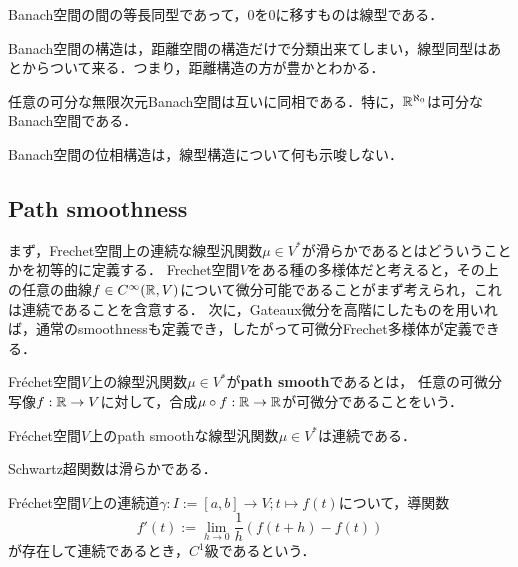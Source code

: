 \documentclass[uplatex,dvipdfmx]{jsreport}
\begin{document}
\begin{theorem}
    Banach空間の間の等長同型であって，$0$を$0$に移すものは線型である．
\end{theorem}
\begin{remarks}
    Banach空間の構造は，距離空間の構造だけで分類出来てしまい，線型同型はあとからついて来る．つまり，距離構造の方が豊かとわかる．
\end{remarks}

\begin{theorem}[Kadec]
    任意の可分な無限次元Banach空間は互いに同相である．特に，$\mathbb{R}^{\aleph_0}$は可分なBanach空間である．
\end{theorem}
\begin{remarks}
    Banach空間の位相構造は，線型構造について何も示唆しない．
\end{remarks}

\subsection{Path smoothness}

\begin{tcolorbox}[colframe=ForestGreen, colback=ForestGreen!10!white,breakable,colbacktitle=ForestGreen!40!white,coltitle=black,fonttitle=\bfseries\sffamily,
title=]
    まず，Frechet空間上の連続な線型汎関数$\mu\in V^*$が滑らかであるとはどういうことかを初等的に定義する．
    Frechet空間$V$をある種の多様体だと考えると，その上の任意の曲線$f\in C^\infty(\mathbb{R},V)$について微分可能であることがまず考えられ，これは連続であることを含意する．
    次に，Gateaux微分を高階にしたものを用いれば，通常のsmoothnessも定義でき，したがって可微分Frechet多様体が定義できる．
\end{tcolorbox}

\begin{definition}
    Fréchet空間$V$上の線型汎関数$\mu\in V^*$が\textbf{path smooth}であるとは，
    任意の可微分写像$f:\mathbb{R}\to V$に対して，合成$\mu\circ f:\mathbb{R}\to\mathbb{R}$が可微分であることをいう．
\end{definition}

\begin{proposition}
    Fréchet空間$V$上のpath smoothな線型汎関数$\mu\in V^*$は連続である．
\end{proposition}

\begin{corollary}
    Schwartz超関数は滑らかである．
\end{corollary}

\begin{definition}[曲線の微分]
    Fréchet空間$V$上の連続道$\gamma:I:=[a,b]\to V;t\mapsto f(t)$について，導関数
    \[f'(t):=\lim_{h\to0}\frac{1}{h}(f(t+h)-f(t))\]
    が存在して連続であるとき，$C^1$級であるという．
\end{definition}
\end{document}
